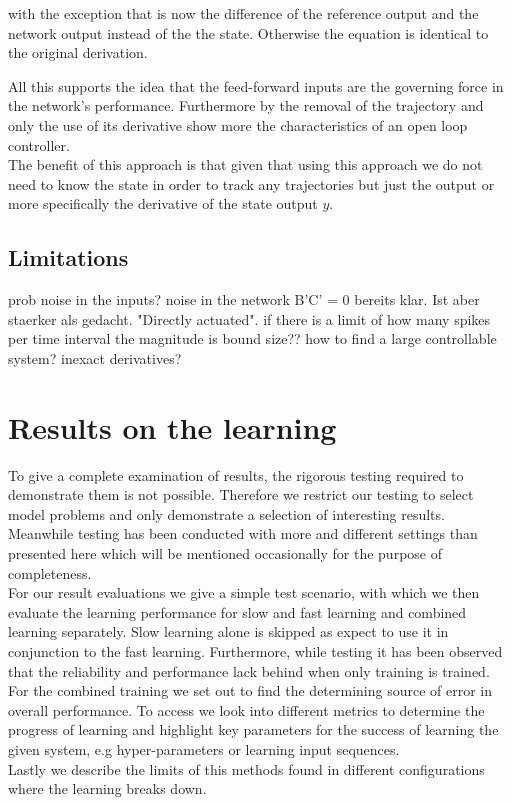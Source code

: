 with the exception that is now the difference of the reference output and the network output instead of the the state. Otherwise the equation is identical to the original derivation. \\

All this supports the idea that the feed-forward inputs are the governing force in the network's performance. Furthermore by the removal of the trajectory and only the use of its derivative show more the characteristics of an open loop controller.\\
The benefit of this approach is that given that using this approach we do not need to know the state in order to track any trajectories but just the output or more specifically the derivative of the state output $y$.\\


\subsection{Limitations}

prob noise in the inputs?
noise in the network
B'C' = 0 bereits klar. Ist aber staerker als gedacht. "Directly actuated".
if there is a limit of how many spikes per time interval the magnitude is bound
size?? how to find a large controllable system?
inexact derivatives?


\section{Results on the learning}\label{sec:res_combined_learning}

To give a complete examination of results, the rigorous testing required to demonstrate them is not possible. Therefore we restrict our testing to select model problems and only demonstrate a selection of interesting results. Meanwhile testing has been conducted with more and different settings than presented here which will be mentioned occasionally for the purpose of completeness.\\
For our result evaluations we give a simple test scenario, with which we then evaluate the learning performance for slow and fast learning and combined learning separately. Slow learning alone is skipped as \cite{bourdoukan_enforcing_2015} expect to use it in conjunction to the fast learning. Furthermore, while testing it has been observed that the reliability and performance lack behind when only training is trained.\\
For the combined training we set out to find the determining  source of error in overall performance. To access we look into different metrics to determine the progress of learning and highlight key parameters for the success of learning the given system, e.g hyper-parameters or learning input sequences.\\
Lastly we describe the limits of this methods found in different configurations where the learning breaks down.

